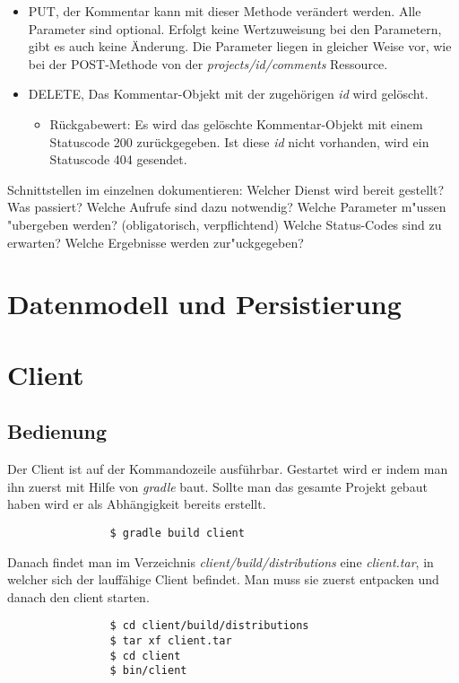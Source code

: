 \documentclass[12pt]{scrartcl}
\begin{document}
\begin{itemize}
\begin{itemize}
\begin{itemize}
						\end{itemize}
						\item PUT, der Kommentar kann mit dieser Methode verändert werden. Alle Parameter sind optional. Erfolgt keine Wertzuweisung bei den Parametern, gibt es auch keine Änderung. Die Parameter liegen in gleicher Weise vor, wie bei der POST-Methode von der \emph{projects/{id}/comments} Ressource.
						\item DELETE, Das Kommentar-Objekt mit der zugehörigen \emph{id} wird gelöscht.
						\begin{itemize}
							\item Rückgabewert: Es wird das gelöschte Kommentar-Objekt mit einem Statuscode 200 zurückgegeben. Ist diese \emph{id} nicht vorhanden, wird ein Statuscode 404 gesendet.
						\end{itemize}
				\end{itemize}
		\end{itemize}
		 Schnittstellen im einzelnen dokumentieren:
		 Welcher Dienst wird bereit gestellt? Was passiert?
		 Welche Aufrufe sind dazu notwendig?
		 Welche Parameter m"ussen "ubergeben werden? (obligatorisch, verpflichtend)
		 Welche Status-Codes sind zu erwarten?
		 Welche Ergebnisse werden zur"uckgegeben? 
	\section{Datenmodell und Persistierung}
	\section{Client}
		\subsection{Bedienung}
		
			Der Client ist auf der Kommandozeile ausführbar. Gestartet wird er indem man ihn zuerst mit Hilfe von \emph{gradle} baut. Sollte man das gesamte Projekt gebaut haben wird er als Abhängigkeit bereits erstellt.
			\begin{verbatim}
				$ gradle build client
			\end{verbatim}
			
			Danach findet man im Verzeichnis \emph{client/build/distributions} eine \emph{client.tar}, in welcher sich der lauffähige Client befindet. Man muss sie zuerst entpacken und danach den client starten.
			
			\begin{verbatim}
				$ cd client/build/distributions
				$ tar xf client.tar
				$ cd client
				$ bin/client
			\end{verbatim}
			
\end{document}
